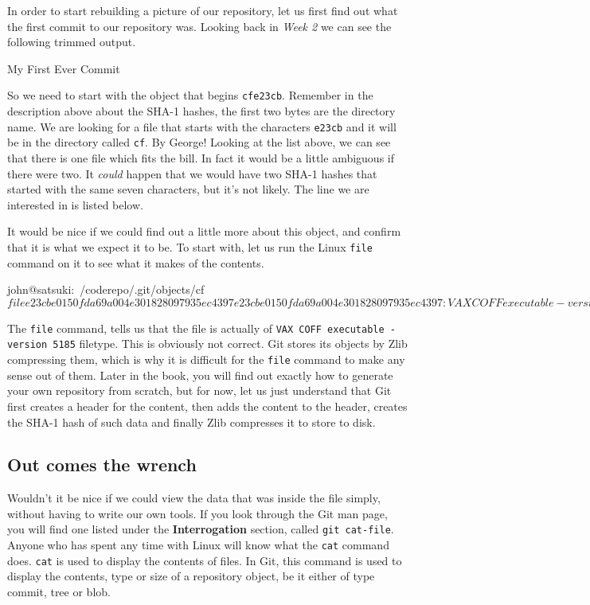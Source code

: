 In order to start rebuilding a picture of our repository, let us first find out what the first commit to our repository was.
Looking back in \emph{Week 2} we can see the following trimmed output.

\begin{code}
 My First Ever Commit
\end{code}

So we need to start with the object that begins \texttt{cfe23cb}.
Remember in the description above about the SHA-1 hashes, the first two bytes are the directory name.
We are looking for a file that starts with the characters \texttt{e23cb} and it will be in the directory called \texttt{cf}.
By George! Looking at the list above, we can see that there is one file which fits the bill.
In fact it would be a little ambiguous if there were two.
It \emph{could} happen that we would have two SHA-1 hashes that started with the same seven characters, but it's not likely.
The line we are interested in is listed below.

\begin{code}
./cf/e23cbe0150fda69a004e301828097935ec4397}
\end{code}

It would be nice if we could find out a little more about this object, and confirm that it is what we expect it to be.
To start with, let us run the Linux \texttt{file} command on it to see what it makes of the contents.

\begin{code}
john@satsuki:~/coderepo/.git/objects/cf$ file e23cbe0150fda69a004e301828097935ec4397
e23cbe0150fda69a004e301828097935ec4397: VAX COFF executable - version 5185
john@satsuki:~/coderepo/.git/objects/cf$
\end{code}

The \texttt{file} command, tells us that the file is actually of \texttt{VAX COFF executable - version 5185} filetype.
This is obviously not correct.
Git stores its objects by Zlib compressing them, which is why it is difficult for the \texttt{file} command to make any sense out of them.
Later in the book, you will find out exactly how to generate your own repository from scratch, but for now, let us just understand that Git first creates a header for the content, then adds the content to the header, creates the SHA-1 hash of such data and finally Zlib compresses it to store to disk.

\subsection{Out comes the wrench}
Wouldn't it be nice if we could view the data that was inside the file simply, without having to write our own tools.
If you look through the Git man page, you will find one listed under the \textbf{Interrogation} section, called \texttt{git cat-file}.
Anyone who has spent any time with Linux will know what the \texttt{cat} command does.
\texttt{cat} is used to display the contents of files.
In Git, this command is used to display the contents, type or size of a repository object, be it either of type commit, tree or blob.

